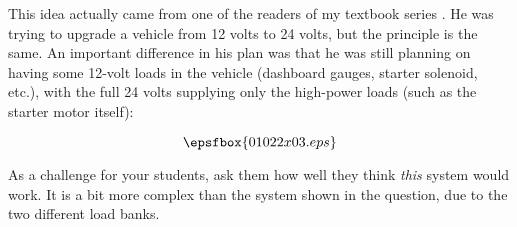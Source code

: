 This idea actually came from one of the readers of my textbook series .  He was trying to upgrade a vehicle from 12 volts to 24 volts, but the principle is the same.  An important difference in his plan was that he was still planning on having some 12-volt loads in the vehicle (dashboard gauges, starter solenoid, etc.), with the full 24 volts supplying only the high-power loads (such as the starter motor itself):

$$\epsfbox{01022x03.eps}$$

As a challenge for your students, ask them how well they think {\it this} system would work.  It is a bit more complex than the system shown in the question, due to the two different load banks.




